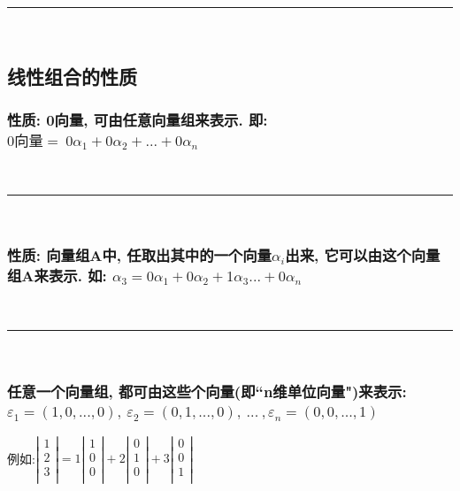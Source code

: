 \documentclass[UTF8]{ctexart}
\begin{document}
~\\
\hrule
~\\

\subsection{线性组合的性质}

\subsubsection{性质: 0向量, 可由任意向量组来表示. 即: $0\text{向量}=\ 0\alpha _1+0\alpha _2+...+0\alpha _n$}

~\\
\hrule
~\\

\subsubsection{性质: 向量组A中, 任取出其中的一个向量$α_i$出来, 它可以由这个向量组A来表示. 如: $\alpha _3=0\alpha _1+0\alpha _2+1\alpha _3...+0\alpha _n$}

~\\
\hrule
~\\

\subsubsection{任意一个向量组, 都可由这些个向量(即``n维单位向量")来表示: $\varepsilon _1=\left( 1,0,...,0 \right) ,\ \varepsilon _2=\left( 0,1,...,0 \right) ,\ ...\ ,\varepsilon _n=\left( 0,0,...,1 \right) $}

例如:$
\left| \begin{array}{c}
	1 \\
	2 \\
	3 \\
\end{array} \right|=1\left| \begin{array}{c}
	1 \\
	0 \\
	0 \\
\end{array} \right|+2\left| \begin{array}{c}
	0 \\
	1 \\
	0 \\
\end{array} \right|+3\left| \begin{array}{c}
	0 \\
	0 \\
	1 \\
\end{array} \right|
$\\
\end{document}
